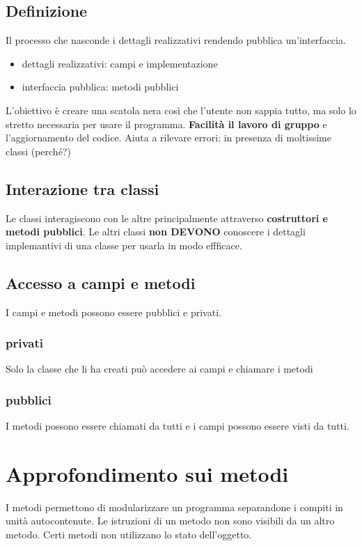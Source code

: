 \documentclass[11pt]{article}
\begin{document}
\subsection{Definizione}
\label{sec:org6677311}
Il processo che nasconde i dettagli realizzativi rendendo pubblica un'interfaccia.
\begin{itemize}
\item dettagli realizzativi: campi e implementazione
\item interfaccia pubblica: metodi pubblici
\end{itemize}
L'obiettivo è creare una scatola nera così che l'utente non sappia tutto, ma solo lo stretto necessaria per usare il programma. \textbf{Facilità il lavoro di gruppo} e l'aggiornamento del codice.
Aiuta a rilevare errori: in presenza di moltissime classi (perché?)
\subsection{Interazione tra classi}
\label{sec:orga8bbb7f}
Le classi interagiscono con le altre principalmente attraverso \textbf{costruttori e metodi pubblici}. Le altri classi \textbf{non DEVONO} conoscere i dettagli implemantivi di una classe per usarla in modo effficace.
\subsection{Accesso a campi e metodi}
\label{sec:org79f9b6e}
I campi e metodi possono essere pubblici e privati.
\subsubsection{privati}
\label{sec:orgd80858e}
Solo la classe che li ha creati può accedere ai campi e chiamare i metodi
\subsubsection{pubblici}
\label{sec:orgc303c9b}
I metodi possono essere chiamati da tutti e i campi possono essere visti da tutti.
\section{Approfondimento sui metodi}
\label{sec:org690dede}
I metodi permettono di modularizzare un programma separandone i compiti in unità autocontenute. Le istruzioni di un metodo non sono visibili da un altro metodo. Certi metodi non utilizzano lo stato dell'oggetto.
\end{document}

